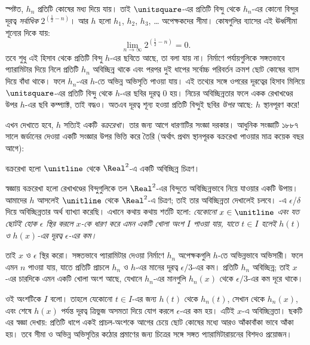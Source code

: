 \documentclass[../../../include/open-logic-section]{subfiles}
\begin{document}
স্পষ্টত, $h_n$ প্রতিটি কোষের মধ্য দিয়ে যায়। তাই
$\unitsquare$-এর প্রতিটি বিন্দু থেকে $h_n$-এর
কোনো বিন্দুর দূরত্ব \emph{সর্বাধিক}
$2^{(\frac{1}{2}-n)}$। আর $h$ হলো
$h_1$, $h_2$, $h_3$, \dots\@
অপেক্ষকদের সীমা। কোষগুলির ব্যাসের এই ঊর্ধ্বসীমা
শূন্যের দিকে যায়:
\[
\lim_{n \rightarrow \infty} 2^{(\frac{1}{2}-n)} = 0.
\]
তবে শুধু এই হিসাব থেকে প্রতিটি বিন্দু $h$-এর
ছবিতে আছে, তা বলা যায় না। নির্মাণে পর্যায়গুলিকে
সঙ্গতভাবে প্যারামিটার দিয়ে নিলে প্রতিটি $h_n$
অবিচ্ছিন্ন থাকে এবং পরপর দুই ধাপের সর্বোচ্চ
পরিবর্তন ক্রমশ ছোট কোষের ব্যাস দিয়ে বাঁধা থাকে।
ফলে $h_n$-এর
$h$-তে অভিন্ন অভিসৃতি পাওয়া যায়। এই তথ্যের সঙ্গে
ওপরের দূরত্বের হিসাব মিলিয়ে $\unitsquare$-এর
প্রতিটি বিন্দু থেকে $h$-এর ছবির দূরত্ব $0$
হয়। নিচের অবিচ্ছিন্নতার ফলে একক রেখাখণ্ডের
উপর $h$-এর ছবি কম্প্যাক্ট, তাই বদ্ধও। অতএব
দূরত্ব শূন্য হওয়া প্রতিটি বিন্দুই ছবির \emph{উপর}
আছে: $h$ স্থানপূরণ করে!{}

এখন দেখাতে হবে, $h$ সত্যিই একটি \emph{বক্ররেখা}।
তার জন্য আগে ধারণাটির সংজ্ঞা দরকার। আধুনিক
সংজ্ঞাটি ১৮৮৭ সালে জর্ডানের দেওয়া একটি সংজ্ঞার
উপর ভিত্তি করে তৈরি (অর্থাৎ প্রথম স্থানপূরক
বক্ররেখা পাওয়ার মাত্র কয়েক বছর আগে):

\begin{defn}
বক্ররেখা হলো $\unitline$ থেকে $\Real^2$-এ
একটি অবিচ্ছিন্ন চিত্রণ।
\end{defn}

স্বজ্ঞায় বক্ররেখা হলো রেখাখণ্ডের বিন্দুগুলিকে
তল $\Real^2$-এর বিন্দুতে অবিচ্ছিন্নভাবে নিয়ে
যাওয়ার একটি উপায়। আমাদের $h$ আসলেই
$\unitline$ থেকে $\Real^2$-এ চিত্রণ; তাই
তার অবিচ্ছিন্নতা দেখালেই চলবে। -এ
$\epsilon$/$\delta$ দিয়ে অবিচ্ছিন্নতার অর্থ
ব্যাখ্যা করেছি। এখানে কথায় কথায় শর্তটি হলো:
\emph{যেকোনো $x \in \unitline$ এবং যত ছোটই হোক
$\epsilon$ স্থির করলে $x$-কে ধারণ করে এমন
একটি খোলা অংশ $I$ পাওয়া যায়, যাতে
$t \in I$ হলেই $h(t)$ ও $h(x)$-এর দূরত্ব
$\epsilon$-এর কম।}

তাই $x$ ও $\epsilon$ স্থির করো। সঙ্গতভাবে
প্যারামিটার দেওয়া নির্মাণে $h_n$ অপেক্ষকগুলি
$h$-তে অভিন্নভাবে অভিসারী। ফলে এমন $n$
পাওয়া যায়, যাতে প্রতিটি প্রাচলে $h_n$ ও $h$-এর
মানের দূরত্ব $\epsilon/3$-এর কম। প্রতিটি $h_n$
অবিচ্ছিন্ন; তাই $x$-এর চারদিকে এমন একটি
খোলা অংশ আছে, যেখানে $h_n$-এর মানগুলি
$h_n(x)$ থেকে $\epsilon/3$-এর কম দূরে থাকে।

ওই অংশটিকে $I$ বলো। তাহলে যেকোনো $t \in I$-এর
জন্য $h(t)$ থেকে $h_n(t)$, সেখান থেকে
$h_n(x)$, এবং শেষে $h(x)$ পর্যন্ত দূরত্ব
ত্রিভুজ অসমতা দিয়ে যোগ করলে $\epsilon$-এর
কম হয়। এটিই $x$-এ অবিচ্ছিন্নতা। ছকটি
এর স্বজ্ঞা দেখায়: প্রতিটি ধাপে একই প্রাচল-অংশকে
আগের চেয়ে ছোট কোষের মধ্যে আরও আঁকাবাঁকা
ভাবে আঁকা হয়। তবে সীমা ও অভিন্ন অভিসৃতির
কঠোর প্রমাণের জন্য চিত্রের সঙ্গে সঙ্গত
প্যারামিটারায়নের বিশদও প্রয়োজন।
\end{document}
